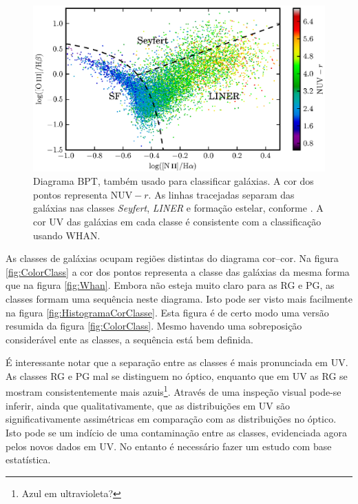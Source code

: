 \begin{figure}
	\includegraphics{figuras/bpt-uv.eps}
	\caption[Cores UV no diagrama BPT.]
	{Diagrama BPT, também usado para classificar galáxias. A cor dos
	pontos representa $\mathrm{NUV}-r$. As linhas tracejadas separam das galáxias nas
	classes {\em Seyfert}, {\em LINER} e formação estelar, conforme
	\citet[linhas S06 e K06 da tabela 1]{CidFernandes2010}. A cor UV das galáxias
	em cada classe é consistente com a classificação usando WHAN.}
	\label{fig:BPTUV}
\end{figure}

As classes de galáxias ocupam regiões distintas do diagrama cor--cor. Na figura
\ref{fig:ColorClass} a cor dos pontos representa a classe das galáxias da mesma
forma que na figura \ref{fig:Whan}. Embora não esteja muito claro para as RG e
PG, as classes formam uma sequência neste diagrama. Isto pode ser visto mais
facilmente na figura \ref{fig:HistogramaCorClasse}. Esta figura é de certo modo
uma versão resumida da figura \ref{fig:ColorClass}. Mesmo havendo uma
sobreposição considerável ente as classes, a sequência está bem definida.

É interessante notar que a separação entre as classes é mais pronunciada em UV.
As classes RG e PG mal se distinguem no óptico, enquanto que em UV as RG se
mostram consistentemente mais azuis\footnote{Azul em ultravioleta?\fixme}.
Através de uma inspeção visual pode-se inferir, ainda que qualitativamente, que
as distribuições em UV são significativamente assimétricas em comparação com as
distribuições no óptico. Isto pode se um indício de uma contaminação entre as
classes, evidenciada agora pelos novos dados em UV. No entanto é necessário
fazer um estudo com base estatística.


